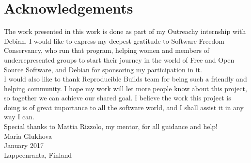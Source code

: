 \section*{Acknowledgements}

The work presented in this work is done as part of my Outreachy internship
with Debian. I would like to express my deepest gratitude to Software Freedom
Conservancy, who run that program, helping women and members of 
underrepresented groups to start their journey in the world of Free and Open
Source Software, and Debian for sponsoring my participation in it.\\
I would also like to thank Reproducible Builds team for being such a 
friendly and helping community. I hope my work will let more people 
know about this project, so together we can achieve our shared goal.
I believe the work this project is doing is of great importance to all 
the software world, and I shall assist it in any way I can.\\
Special thanks to Mattia Rizzolo, my mentor, for all guidance and help!\\

Maria Glukhova\\
January 2017\\
Lappeenranta, Finland\\
